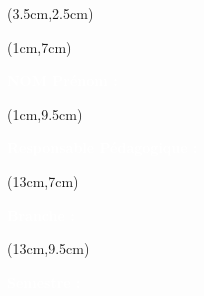 \begin{titlepage}
    \thispagestyle{empty}

    

    \begin{textblock*}{14cm}(3.5cm,2.5cm)
        \begin{LARGE}
            \makeatletter
            \justifying

            \begin{center}
                \textbf{\textcolor{white}{\titletext}}
            \end{center}

            \makeatother
        \end{LARGE}
    \end{textblock*}

    \begin{textblock*}{10cm}(1cm,7cm)
        \begin{flushleft}
            \large
            \textbf{\textcolor{white}{NOM Prénom :}}
            \\
            \textbf{\textcolor{white}{\theauthor}}
        \end{flushleft}
    \end{textblock*}

    \begin{textblock*}{9cm}(1cm,9.5cm)
        \begin{flushleft}
            \large
            \textbf{\textcolor{white}{Responsable Pédagogique :}}
            \\
            \textbf{\textcolor{white}{\theRPeda}}
        \end{flushleft}
    \end{textblock*}


    \begin{textblock*}{7cm}(13cm,7cm)
        \begin{flushleft}
            \large
            \textbf{\textcolor{white}{Branche :}}
            \\
            \textcolor{white}{\theUE}
        \end{flushleft}
    \end{textblock*}

    \begin{textblock*}{7cm}(13cm,9.5cm)
        \begin{flushleft}
            \large
            \textbf{\textcolor{white}{Semestre :}}
            \\
            \textcolor{white}{\theSemestre}
        \end{flushleft}
    \end{textblock*}


\end{titlepage}
